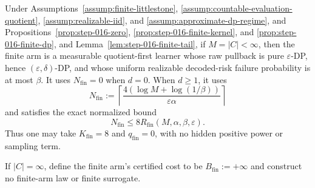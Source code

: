 \begin{proposition}\label{prop:step-016-finite-arm}
Under Assumptions~\ref{assump:finite-littlestone},
\ref{assump:countable-evaluation-quotient},
\ref{assump:realizable-iid}, and
\ref{assump:approximate-dp-regime}, and
Propositions~\ref{prop:step-016-zero},
\ref{prop:step-016-finite-kernel}, and
\ref{prop:step-016-finite-dp}, and
Lemma~\ref{lem:step-016-finite-tail}, if \(M=|C|<\infty\), then the finite
arm is a measurable quotient-first learner whose raw pullback is pure
\(\varepsilon\)-DP, hence \((\varepsilon,\delta)\)-DP, and whose uniform
realizable decoded-risk failure probability is at most \(\beta\). It uses
\(N_{\mathrm{fin}}=0\) when \(d=0\). When \(d\ge1\), it uses
\[
N_{\mathrm{fin}}
:=\left\lceil
\frac{4(\log M+\log(1/\beta))}{\varepsilon\alpha}
\right\rceil
\tag{5.1}
\]
and satisfies the exact normalized bound
\[
N_{\mathrm{fin}}
\le8R_{\mathrm{fin}}(M,\alpha,\beta,\varepsilon).
\tag{5.2}
\]
Thus one may take \(K_{\mathrm{fin}}=8\) and
\(q_{\mathrm{fin}}=0\), with no hidden positive power or sampling term.

If \(|C|=\infty\), define the finite arm's certified cost to be
\(B_{\mathrm{fin}}:=+\infty\) and construct no finite-arm law or finite
surrogate.


\end{proposition}

